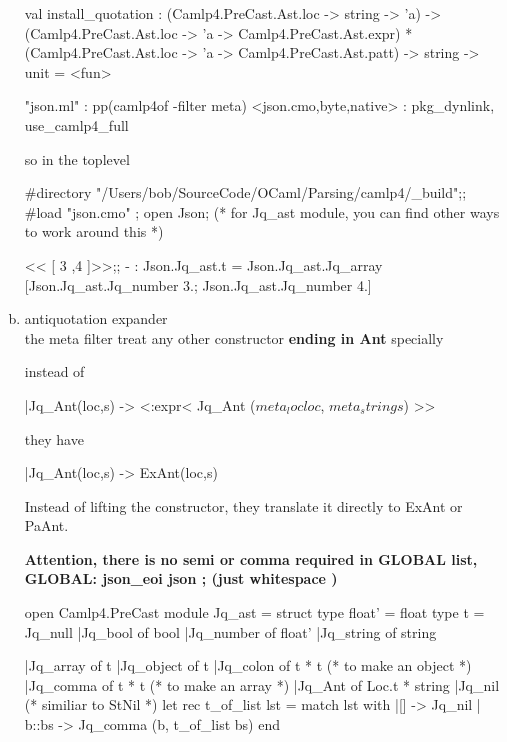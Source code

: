 \begin{enumerate}[(a)]
\begin{redcode}
\end{redcode}
\begin{bluetext}
val install_quotation :
  (Camlp4.PreCast.Ast.loc -> string -> 'a) ->
  (Camlp4.PreCast.Ast.loc -> 'a -> Camlp4.PreCast.Ast.expr) *
  (Camlp4.PreCast.Ast.loc -> 'a -> Camlp4.PreCast.Ast.patt) -> string -> unit =
  <fun>  
\end{bluetext}
\begin{bluecode}
"json.ml" : pp(camlp4of -filter meta)
<json.{cmo,byte,native}> : pkg_dynlink, use_camlp4_full
\end{bluecode}
so in the toplevel

\begin{redcode}
#directory "/Users/bob/SourceCode/OCaml/Parsing/camlp4/_build";;
#load "json.cmo" ;
open Json;  (* for Jq_ast module, you can find other ways to work
around this *)
\end{redcode}

\begin{alternate}
 << [ 3 ,4 ]>>;;
- : Json.Jq_ast.t = Json.Jq_ast.Jq_array [Json.Jq_ast.Jq_number 3.; Json.Jq_ast.Jq_number
4.]
\end{alternate}


\item antiquotation expander \\

  the meta filter treat any other constructor \textbf{ending in Ant}
specially 

instead of 
\begin{bluecode}
  |Jq_Ant(loc,s) -> <:expr< Jq_Ant ($meta_loc loc$, $meta_string s$) >>
\end{bluecode}
they have
\begin{redcode}
  |Jq_Ant(loc,s) -> ExAnt(loc,s) 
\end{redcode}

Instead of lifting the constructor, they translate it directly to
ExAnt or PaAnt.

\textbf{Attention, there is no semi or comma required in GLOBAL list,
  GLOBAL: json\_eoi  json ; (just whitespace ) }


  \begin{bluecode}
open Camlp4.PreCast  
module Jq_ast = struct 
  type float' = float 
  type t = 
      Jq_null 
    |Jq_bool of bool 
    |Jq_number of float' 
    |Jq_string of string 

    |Jq_array of t  
    |Jq_object of t 
    |Jq_colon of t * t  (* to make an object *)
    |Jq_comma of t * t  (* to make an array *)
    |Jq_Ant of Loc.t * string 
    |Jq_nil (* similiar to StNil *)
  let rec t_of_list lst = match lst with 
    |[] -> Jq_nil 
    | b::bs -> Jq_comma (b, t_of_list bs)
end 


\end{bluecode}
\end{enumerate}
